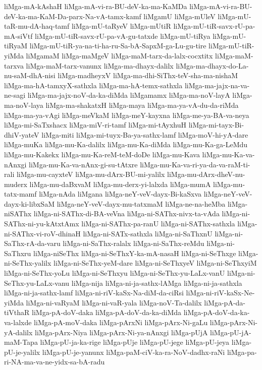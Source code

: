 {liMga-mA-kAshaH
liMga-mA-vi-ra-BU-deV-ka-ma-KaMDa
liMga-mA-vi-ra-BU-deV-ka-ma-KaM-Da-parx-Na-vA-tamx-kamf
liMgamU
liMga-mUleV
liMga-mU-taR-mu-dA-haq-tamf
liMga-mU-taRyeV
liMga-mUtiR
liMga-mU-tiR-savx-rU-pa-mA-siVtf
liMga-mU-tiR-savx-rU-pa-vA-gu-tatxde
liMga-mU-tiRya
liMga-mU-tiRyaM
liMga-mU-tiR-ya-na-ti-ha-ru-Sa-bA-SapxM-ga-Lu-gu-tire
liMga-mU-tiR-yiMda
liMgamaM
liMga-maMgeV
liMga-maM-tarx-da-lalx-cocxtitx
liMga-maM-tarxva
liMga-maM-tarx-vanunx
liMga-ma-dhayx-dalilx
liMga-ma-dhayx-do-La-nu-saM-dhA-nisi
liMga-madheyxV
liMga-ma-dhi-SiThx-teV-sha-ma-nishaM
liMga-ma-hA-tamxyX-sathxla
liMga-ma-hA-temx-sathxla
liMga-ma-jajx-na-va-ne-sagi
liMga-ma-jajx-noV-da-ka-diMda
liMgamamx
liMga-ma-noV-layA
liMga-ma-noV-laya
liMga-ma-shakatxH
liMga-maya
liMga-ma-ya-vA-du-da-riMda
liMga-ma-ya-vAgi
liMga-meVkaM
liMga-meY-kayxna
liMga-me-ya-BA-va-neya
liMga-mi-SaTxshacx
liMga-miV-ri-tamf
liMga-mi-tAyxhuH
liMga-mi-tayx-Bi-dhiV-yateV
liMga-miti
liMga-mi-tuyx-Ba-ya-sathx-lamf
liMga-moV-hi-yA-dare
liMga-muKa
liMga-mu-Ka-dalilx
liMga-mu-Ka-diMda
liMga-mu-Ka-ga-LeMdu
liMga-mu-Kakekx
liMga-mu-Ka-reM-teM-doDe
liMga-mu-Kava
liMga-mu-Ka-va-nAnxgi
liMga-mu-Ka-va-nAnx-gi-su-tAtxre
liMga-mu-Ka-va-ri-ya-da-va-raM-ti-rali
liMga-mu-cayxteV
liMga-mu-dArx-BU-mi-yalilx
liMga-mu-dArx-dheV-nu-muderx
liMga-mu-daBxvaM
liMga-mu-derx-yi-lalxda
liMga-mumA
liMga-mu-tatx-mamf
liMga-nAda
liMgana
liMga-neY-veV-dayx-Bi-kaSxva
liMga-neY-veV-dayx-ki-libxSaM
liMga-neY-veV-dayx-mu-tatxmaM
liMga-ne-na-heMba
liMga-niSAThx
liMga-ni-SAThx-di-BA-veVna
liMga-ni-SAThx-nivx-ta-vAda
liMga-ni-SAThx-ni-yu-kAtxtAmx
liMga-ni-SAThx-pa-ranU
liMga-ni-SAThx-sathxla
liMga-ni-SAThx-vi-roV-dhinaH
liMga-ni-SATx-sathxla
liMga-ni-SaThxnU
liMga-ni-SaThx-rA-da-varu
liMga-ni-SaThx-ralalx
liMga-ni-SaThx-reMdu
liMga-ni-SaThxru
liMga-niSeThx
liMga-ni-SeThxY-ka-mA-nasaH
liMga-ni-SeThxge
liMga-ni-SeThx-yalilx
liMga-ni-SeThx-yeM-dare
liMga-ni-SeThxyeV
liMga-ni-SeThxyiM
liMga-ni-SeThx-yoLu
liMga-ni-SeThxyu
liMga-ni-SeThx-yu-LaLx-vanU
liMga-ni-SeThx-yu-LaLx-vanu
liMga-nija
liMga-ni-ja-sathx-lAMga
liMga-ni-ja-sathxla
liMga-ni-ja-sathx-lamf
liMga-ni-riV-kaSx-Na-diM-da-ciRsi
liMga-ni-riV-kaSx-Ne-yiMda
liMga-ni-vaRyaM
liMga-ni-vaR-yala
liMga-noV-Ta-dalilx
liMga-pA-da-tiVthaR
liMga-pA-doV-daka
liMga-pA-doV-da-ka-diMda
liMga-pA-doV-da-ka-va-lalxde
liMga-pA-moV-daka
liMga-pArxNi
liMga-pArx-Ni-gaLu
liMga-pArx-Ni-yA-dalilx
liMga-pArx-Niya
liMga-pArx-Ni-ya-nAnxgi
liMga-pUjA
liMga-pU-jA-maM-Tapa
liMga-pU-ja-ka-rige
liMga-pUje
liMga-pU-jege
liMga-pU-jeya
liMga-pU-je-yalilx
liMga-pU-je-yanunx
liMga-paM-ciV-ka-ra-NoV-dadhx-raNi
liMga-pa-ri-NA-ma-va-ne-yidx-sa-bA-radu
}
